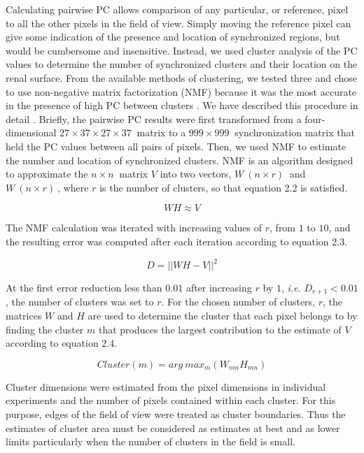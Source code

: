 	Calculating pairwise PC allows comparison of any particular, or reference, pixel to all the other pixels in the field of view. Simply moving the reference pixel can give some indication of the presence and location of synchronized regions, but would be cumbersome and insensitive. Instead, we used cluster analysis of the PC values to determine the number of synchronized clusters and their location on the renal surface. From the available methods of clustering, we tested three and chose to use non-negative matrix factorization (NMF) because it was the most accurate in the presence of high PC between clusters \cite{Scully14}. We have described this procedure in detail \cite{Scully14}. Briefly, the pairwise PC results were first transformed from a four-dimensional $27 \times 37 \times 27 \times 37 \ $ matrix to a $999 \times 999 \ $ synchronization matrix that held the PC values between all pairs of pixels. Then, we used NMF to estimate the number and location of synchronized clusters. NMF is an algorithm designed to approximate the $n \times n \ $ matrix $V$ into two vectors, $W \ (n \times r) \ $ and $W \ (n \times r) \ $, where $r$ is the number of clusters, so that equation 2.2 is satisfied.
	
\begin{equation}
WH \approx V
\end{equation}

	The NMF calculation was iterated with increasing values of $r$, from $1$ to $10$, and the resulting error was computed after each iteration according to equation 2.3. 

\begin{equation}
D = \lvert \lvert WH - V \rvert \rvert ^2
\end{equation}

	At the first error reduction less than $0.01$ after increasing $r$ by $1$, \emph{i.e.} $D_{r+1} < 0.01$, the number of clusters was set to $r$. For the chosen number of clusters, $r$, the matrices $W$ and $H$ are used to determine the cluster that each pixel belongs to by finding the cluster $m$ that produces the largest contribution to the estimate of $V$ according to equation 2.4.

\begin{equation}
Cluster(m) = arg \ max_m(W_{nm}H_{mn})
\end{equation}

	Cluster dimensions were estimated from the pixel dimensions in individual experiments and the number of pixels contained within each cluster. For this purpose, edges of the field of view were treated as cluster boundaries. Thus the estimates of cluster area must be considered as estimates at best and as lower limits particularly when the number of clusters in the field is small.


